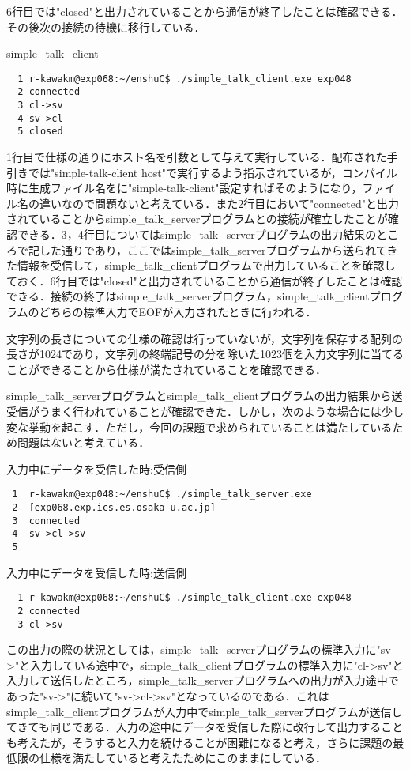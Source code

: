 \documentclass[a4j]{jarticle}
\newenvironment{bit}{\begin{breakitembox}}{\end{breakitembox}} %
\newcommand{\sts}{simple\_talk\_serverプログラム}
\newcommand{\stc}{simple\_talk\_clientプログラム}
\begin{document}
6行目では"closed"と出力されていることから通信が終了したことは確認できる．その後次の接続の待機に移行している．

\begin{bit}[l]{simple\_talk\_client}
\begin{verbatim}
  1	r-kawakm@exp068:~/enshuC$ ./simple_talk_client.exe exp048
  2	connected
  3	cl->sv
  4	sv->cl
  5	closed
\end{verbatim}
\end{bit}

1行目で仕様の通りにホスト名を引数として与えて実行している．配布された手引きでは"simple-talk-client host"で実行するよう指示されているが，コンパイル時に生成ファイル名をに"simple-talk-client"設定すればそのようになり，ファイル名の違いなので問題ないと考えている．また2行目において"connected"と出力されていることから\sts との接続が確立したことが確認できる．3，4行目については\sts の出力結果のところで記した通りであり，ここでは\sts から送られてきた情報を受信して，\stc で出力していることを確認しておく．6行目では"closed"と出力されていることから通信が終了したことは確認できる．接続の終了は\sts ，\stc のどちらの標準入力でEOFが入力されたときに行われる．

文字列の長さについての仕様の確認は行っていないが，文字列を保存する配列の長さが1024であり，文字列の終端記号の分を除いた1023個を入力文字列に当てることができることから仕様が満たされていることを確認できる．

\sts と\stc の出力結果から送受信がうまく行われていることが確認できた．しかし，次のような場合には少し変な挙動を起こす．ただし，今回の課題で求められていることは満たしているため問題はないと考えている．

\begin{bit}[l]{入力中にデータを受信した時:受信側}
\begin{verbatim}
 1	r-kawakm@exp048:~/enshuC$ ./simple_talk_server.exe
 2	[exp068.exp.ics.es.osaka-u.ac.jp]
 3	connected
 4	sv->cl->sv
 5
\end{verbatim}
\end{bit}

\begin{bit}[l]{入力中にデータを受信した時:送信側}
\begin{verbatim}
  1	r-kawakm@exp068:~/enshuC$ ./simple_talk_client.exe exp048
  2	connected
  3	cl->sv
\end{verbatim}
\end{bit}

この出力の際の状況としては，\sts の標準入力に"sv->"と入力している途中で，\stc の標準入力に"cl->sv"と入力して送信したところ，\sts への出力が入力途中であった"sv->"に続いて"sv->cl->sv"となっているのである．これは\stc が入力中で\sts が送信してきても同じである．入力の途中にデータを受信した際に改行して出力することも考えたが，そうすると入力を続けることが困難になると考え，さらに課題の最低限の仕様を満たしていると考えたためにこのままにしている．
\end{document}
